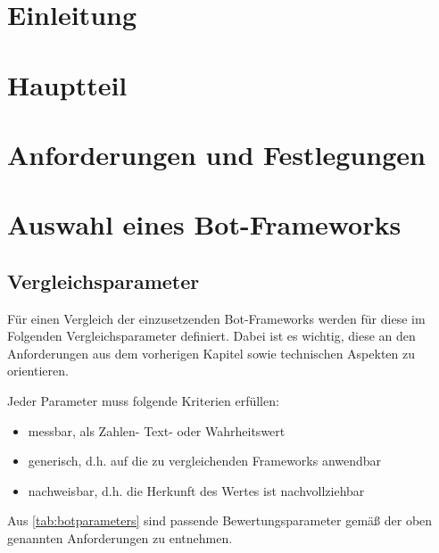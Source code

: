 
\section{Einleitung}

\clearpage
\section{Hauptteil}

\clearpage
\section{Anforderungen und Festlegungen}

\clearpage
\section{Auswahl eines Bot-Frameworks}
\subsection{Vergleichsparameter}
Für einen Vergleich der einzusetzenden Bot-Frameworks werden für diese im Folgenden Vergleichsparameter definiert. Dabei ist es wichtig, diese an den Anforderungen aus dem vorherigen Kapitel sowie technischen Aspekten zu orientieren.

Jeder Parameter muss folgende Kriterien erfüllen:

\begin{itemize}
    \item messbar, als Zahlen- Text- oder Wahrheitswert
    \item generisch, d.h. auf die zu vergleichenden Frameworks anwendbar
    \item nachweisbar, d.h. die Herkunft des Wertes ist nachvollziehbar
\end{itemize}

Aus \autoref{tab:botparameters} sind passende Bewertungsparameter gemäß der oben genannten Anforderungen zu entnehmen.

